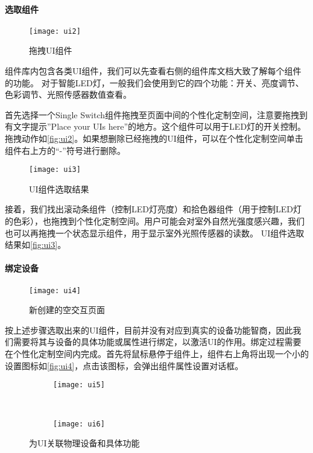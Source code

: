\paragraph{选取组件}

\begin{figure}[htbp]
	\centering
	\texttt{[image: ui2]}
	\caption{拖拽UI组件}
	\label{fig:ui2}
\end{figure}

组件库内包含各类UI组件，我们可以先查看右侧的组件库文档大致了解每个组件的功能。
对于智能LED灯，一般我们会使用到它的四个功能：开关、亮度调节、色彩调节、光照传感器数值查看。

首先选择一个Single Switch组件拖拽至页面中间的个性化定制空间，注意要拖拽到有文字提示”Place your UIs here”的地方。这个组件可以用于LED灯的开关控制。拖拽动作如\autoref{fig:ui2}。如果想删除已经拖拽的UI组件，可以在个性化定制空间单击组件右上方的“-”符号进行删除。

\begin{figure}[t]
	\centering
	\texttt{[image: ui3]}
	\caption{UI组件选取结果}
	\label{fig:ui3}
\end{figure}

接着，我们找出滚动条组件（控制LED灯亮度）和拾色器组件（用于控制LED灯的色彩），也拖拽到个性化定制空间。用户可能会对室外自然光强度感兴趣，我们也可以再拖拽一个状态显示组件，用于显示室外光照传感器的读数。
UI组件选取结果如\autoref{fig:ui3}。

\paragraph{绑定设备}

\begin{figure}[htbp]
	\centering
	\texttt{[image: ui4]}
	\caption{新创建的空交互页面}
	\label{fig:ui4}
\end{figure}

按上述步骤选取出来的UI组件，目前并没有对应到真实的设备功能智商，因此我们需要将其与设备的具体功能或属性进行绑定，以激活UI的作用。绑定过程需要在个性化定制空间内完成。首先将鼠标悬停于组件上，组件右上角将出现一个小的设置图标如\autoref{fig:ui4}，点击该图标，会弹出组件属性设置对话框。

\begin{figure}[htbp]
	\centering
	\begin{subfigure}{.48\linewidth}
		\texttt{[image: ui5]}
		\caption{}
	\end{subfigure}
	\ 
	\begin{subfigure}{.44\linewidth}
		\texttt{[image: ui6]}
		\caption{}
	\end{subfigure}
	\caption{为UI关联物理设备和具体功能}\label{fig:ui56}
\end{figure}

